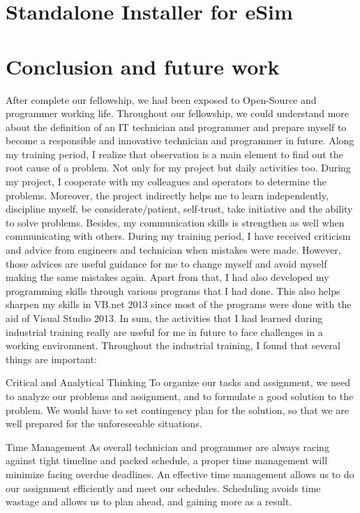 \documentclass[12pt,a4paper]{report}
\begin{document}
\chapter{\textbf{Standalone Installer for eSim}}

\chapter{\textbf{Conclusion and future work}}
After complete our fellowship, we had been exposed to Open-Source and programmer working life. Throughout our fellowship, we could understand more about the definition of an IT technician and programmer and prepare myself to become a responsible and innovative technician and programmer in future. Along my training period, I realize that observation is a main element to find out the root cause of a problem. Not only for my project but daily activities too. During my project, I cooperate with my colleagues and operators to determine the problems. Moreover, the project indirectly helps me to learn independently, discipline myself, be considerate/patient, self-trust, take initiative and the ability to solve problems. Besides, my communication skills is strengthen as well when communicating with others. During my training period, I have received criticism and advice from engineers and technician when mistakes were made. However, those advices are useful guidance for me to change myself and avoid myself making the same mistakes again. Apart from that, I had also developed my programming skills through various programs that I had done. This also helps sharpen my skills in VB.net 2013 since most of the programs were done with the aid of Visual Studio 2013. In sum, the activities that I had learned during industrial training really are useful for me in future to face challenges in a working environment. Throughout the industrial training, I found that several things are important: 

Critical and Analytical Thinking
To organize our tasks and assignment, we need to analyze our problems and assignment, and to formulate a good solution to the problem. We would have to set contingency plan for the solution, so that we are well prepared for the unforeseeable situations. 

Time Management
As overall technician and programmer are always racing against tight timeline and packed schedule, a proper time management will minimize facing overdue deadlines. An effective time management allows us to do our assignment efficiently and meet our schedules. Scheduling avoids time wastage and allows us to plan ahead, and gaining more as a result. 
\end{document}
